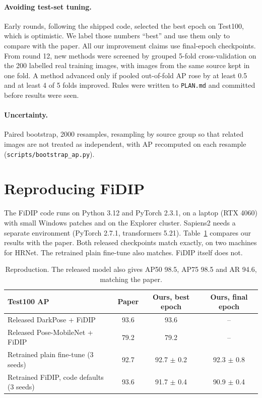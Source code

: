 \documentclass[11pt]{article}
\newcommand{\repo}[1]{\texttt{#1}}
\begin{document}
\paragraph{Avoiding test-set tuning.} Early rounds, following the shipped code, selected the best epoch on Test100, which is optimistic. We label those numbers ``best'' and use them only to compare with the paper. All our improvement claims use final-epoch checkpoints. From round 12, new methods were screened by grouped 5-fold cross-validation on the 200 labelled real training images, with images from the same source kept in one fold. A method advanced only if pooled out-of-fold AP rose by at least 0.5 and at least 4 of 5 folds improved. Rules were written to \repo{PLAN.md} and committed before results were seen.

\paragraph{Uncertainty.} Paired bootstrap, 2000 resamples, resampling by source group so that related images are not treated as independent, with AP recomputed on each resample (\repo{scripts/bootstrap\_ap.py}).

\section{Reproducing FiDIP}
\label{sec:repro}
The FiDIP code runs on Python 3.12 and PyTorch 2.3.1, on a laptop (RTX 4060) with small Windows patches and on the Explorer cluster. Sapiens2 needs a separate environment (PyTorch 2.7.1, transformers 5.21). Table~\ref{tab:repro} compares our results with the paper. Both released checkpoints match exactly, on two machines for HRNet. The retrained plain fine-tune also matches. FiDIP itself does not.

\begin{table}[h]
\centering\small
\begin{tabular}{@{}lccc@{}}
\toprule
Test100 AP & Paper & Ours, best epoch & Ours, final epoch \\
\midrule
Released DarkPose + FiDIP & 93.6 & 93.6 & -- \\
Released Pose-MobileNet + FiDIP & 79.2 & 79.2 & -- \\
Retrained plain fine-tune (3 seeds) & 92.7 & 92.7 $\pm$ 0.2 & 92.3 $\pm$ 0.8 \\
Retrained FiDIP, code defaults (3 seeds) & 93.6 & 91.7 $\pm$ 0.4 & 90.9 $\pm$ 0.4 \\
\bottomrule
\end{tabular}
\caption{Reproduction. The released model also gives AP50 98.5, AP75 98.5 and AR 94.6, matching the paper.}
\label{tab:repro}
\end{table}
\end{document}
